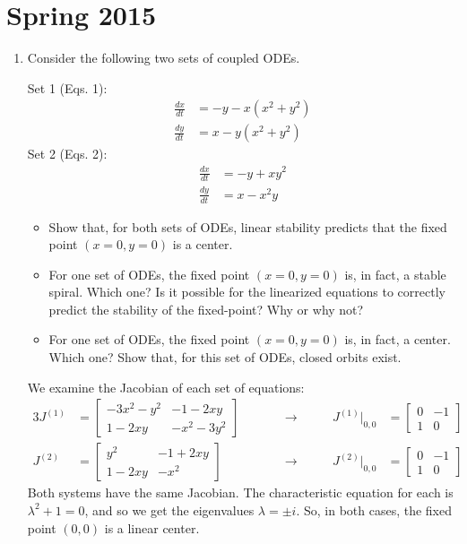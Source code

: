 \documentclass[10pt,letterpaper]{report}
\newcommand{\andso}{&\qquad &\rightarrow&\qquad}
\newcommand{\mtx}[2]{\left[\begin{array}{#1}#2\end{array}\right]}
\renewcommand{\chaptermark}[1]{%
\markboth{#1}{}}
\begin{document}
\chapter*{Spring 2015}
\chaptermark{Spring 2015}

\begin{enumerate}
\item \begin{qbox}
Consider the following two sets of coupled ODEs.

Set 1 (Eqs. 1):
\begin{align*}
    \frac{dx}{dt} &= -y - x\left(x^2 + y^2\right) \\
    \frac{dy}{dt} &= x - y \left(x^2 + y^2\right)
\end{align*}
Set 2 (Eqs. 2):
\begin{align*}
    \frac{dx}{dt} &= -y + xy^2 \\
    \frac{dy}{dt} &= x - x^2 y
\end{align*}
\begin{itemize}
    \item Show that, for both sets of ODEs, linear stability predicts that the fixed point $(x = 0, y = 0)$ is a center.
    
    \item For one set of ODEs, the fixed point $(x = 0, y = 0)$ is, in fact, a stable spiral. Which one? Is it possible for the linearized equations to correctly predict the stability of the fixed-point? Why or why not?
    
    \item For one set of ODEs, the fixed point $(x = 0, y = 0)$ is, in fact, a center. Which one? Show that, for this set of ODEs, closed orbits exist.
\end{itemize}
\end{qbox}

We examine the Jacobian of each set of equations:
\begin{alignat*}{3}
    J^{(1)} &= \mtx{cc}{-3x^2 - y^2 & -1 - 2xy \\ 1 - 2xy & -x^2 - 3y^2} \andso J^{(1)}\big\vert_{0,0} &= \mtx{cr}{0 & -1 \\ 1 & 0}
    \\
    J^{(2)} &= \mtx{cc}{y^2 & -1 + 2xy \\ 1 - 2xy & -x^2} \andso J^{(2)}\big\vert_{0,0} &= \mtx{cr}{0 & -1 \\ 1 & 0}
\end{alignat*}
Both systems have the same Jacobian. The characteristic equation for each is $\lambda^2 + 1 = 0$, and so we get the eigenvalues $\lambda = \pm i$. So, in both cases, the fixed point $(0, 0)$ is a linear center.


\end{enumerate}
\end{document}
